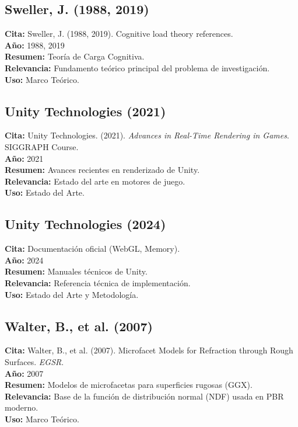 \subsection*{Sweller, J. (1988, 2019)}
\textbf{Cita:} Sweller, J. (1988, 2019). Cognitive load theory references. \\
\textbf{Año:} 1988, 2019 \\
\textbf{Resumen:} Teoría de Carga Cognitiva. \\
\textbf{Relevancia:} Fundamento teórico principal del problema de investigación. \\
\textbf{Uso:} Marco Teórico.

\subsection*{Unity Technologies (2021)}
\textbf{Cita:} Unity Technologies. (2021). \textit{Advances in Real-Time Rendering in Games}. SIGGRAPH Course. \\
\textbf{Año:} 2021 \\
\textbf{Resumen:} Avances recientes en renderizado de Unity. \\
\textbf{Relevancia:} Estado del arte en motores de juego. \\
\textbf{Uso:} Estado del Arte.

\subsection*{Unity Technologies (2024)}
\textbf{Cita:} Documentación oficial (WebGL, Memory). \\
\textbf{Año:} 2024 \\
\textbf{Resumen:} Manuales técnicos de Unity. \\
\textbf{Relevancia:} Referencia técnica de implementación. \\
\textbf{Uso:} Estado del Arte y Metodología.

\subsection*{Walter, B., et al. (2007)}
\textbf{Cita:} Walter, B., et al. (2007). Microfacet Models for Refraction through Rough Surfaces. \textit{EGSR}. \\
\textbf{Año:} 2007 \\
\textbf{Resumen:} Modelos de microfacetas para superficies rugosas (GGX). \\
\textbf{Relevancia:} Base de la función de distribución normal (NDF) usada en PBR moderno. \\
\textbf{Uso:} Marco Teórico.

